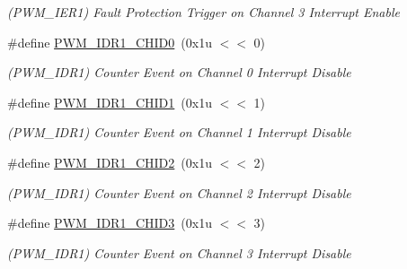 \begin{DoxyCompactItemize}
\begin{DoxyCompactList}\small\item\em (P\+W\+M\+\_\+\+I\+E\+R1) Fault Protection Trigger on Channel 3 Interrupt Enable \end{DoxyCompactList}\item 
\mbox{\label{group__SAMV71__PWM_gaac74a9e06fc4dd8a1c2e30bcaaa6dd17}} 
\#define \mbox{\hyperlink{group__SAMV71__PWM_gaac74a9e06fc4dd8a1c2e30bcaaa6dd17}{P\+W\+M\+\_\+\+I\+D\+R1\+\_\+\+C\+H\+I\+D0}}~(0x1u $<$$<$ 0)
\begin{DoxyCompactList}\small\item\em (P\+W\+M\+\_\+\+I\+D\+R1) Counter Event on Channel 0 Interrupt Disable \end{DoxyCompactList}\item 
\mbox{\label{group__SAMV71__PWM_ga80cc87b54b89b298d6bf32700df8cb9a}} 
\#define \mbox{\hyperlink{group__SAMV71__PWM_ga80cc87b54b89b298d6bf32700df8cb9a}{P\+W\+M\+\_\+\+I\+D\+R1\+\_\+\+C\+H\+I\+D1}}~(0x1u $<$$<$ 1)
\begin{DoxyCompactList}\small\item\em (P\+W\+M\+\_\+\+I\+D\+R1) Counter Event on Channel 1 Interrupt Disable \end{DoxyCompactList}\item 
\mbox{\label{group__SAMV71__PWM_ga668fe202fa0cdba3d8e740339740a455}} 
\#define \mbox{\hyperlink{group__SAMV71__PWM_ga668fe202fa0cdba3d8e740339740a455}{P\+W\+M\+\_\+\+I\+D\+R1\+\_\+\+C\+H\+I\+D2}}~(0x1u $<$$<$ 2)
\begin{DoxyCompactList}\small\item\em (P\+W\+M\+\_\+\+I\+D\+R1) Counter Event on Channel 2 Interrupt Disable \end{DoxyCompactList}\item 
\mbox{\label{group__SAMV71__PWM_ga5436d6d3d46e185a265960da08b61718}} 
\#define \mbox{\hyperlink{group__SAMV71__PWM_ga5436d6d3d46e185a265960da08b61718}{P\+W\+M\+\_\+\+I\+D\+R1\+\_\+\+C\+H\+I\+D3}}~(0x1u $<$$<$ 3)
\begin{DoxyCompactList}\small\item\em (P\+W\+M\+\_\+\+I\+D\+R1) Counter Event on Channel 3 Interrupt Disable \end{DoxyCompactList}\item 

\end{DoxyCompactItemize}
